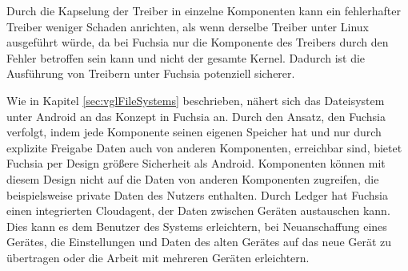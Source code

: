 \documentclass[a4paper]{scrartcl}
\begin{document}
Durch die Kapselung der Treiber in einzelne Komponenten kann ein fehlerhafter Treiber weniger Schaden anrichten, als wenn derselbe Treiber unter Linux ausgeführt würde, da bei Fuchsia nur die Komponente des Treibers durch den Fehler betroffen sein kann und nicht der gesamte Kernel. Dadurch ist die Ausführung von Treibern unter Fuchsia potenziell sicherer.

Wie in Kapitel \ref{sec:vglFileSystems} beschrieben, nähert sich das Dateisystem unter Android an das Konzept in Fuchsia an. Durch den Ansatz, den Fuchsia verfolgt, indem jede Komponente seinen eigenen Speicher hat und nur durch explizite Freigabe Daten auch von anderen Komponenten, erreichbar sind, bietet Fuchsia per Design größere Sicherheit als Android. Komponenten können mit diesem Design nicht auf die Daten von anderen Komponenten zugreifen, die beispielsweise private Daten des Nutzers enthalten. Durch Ledger hat Fuchsia einen integrierten Cloudagent, der Daten zwischen Geräten austauschen kann. Dies kann es dem Benutzer des Systems erleichtern, bei Neuanschaffung eines Gerätes, die Einstellungen und Daten des alten Gerätes auf das neue Gerät zu übertragen oder die Arbeit mit mehreren Geräten erleichtern.


\end{document}
